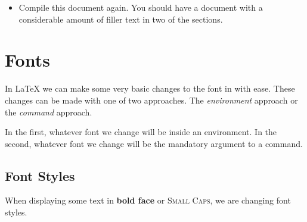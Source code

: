 \begin{itemize}
\begin{itemize}
    \begin{lstlisting}
\section{Short Content}


     \end{lstlisting}


     As long as the downloaded file was placed in the
     appropriate place, you can safely ignore what this command does.

   \item Similarly, add \texttt{\textbackslash{}input\{./loremipsum.txt\}} on a new
     line directly after \texttt{\textbackslash{}section\{Long~Content\}}, as in

    \begin{lstlisting}
\section{Long Content}


     \end{lstlisting}

     As long as the downloaded file was placed in the appropriate place, you can
     safely ignore what this command does.
   \end{itemize}

 \item Compile this document again. You should have a document with a
   considerable amount of filler text in two of the sections.
\end{itemize}

\section{Fonts}

In \LaTeX{} we can make some very basic changes to the font in with ease. These
changes can be made with one of two approaches. The \textit{environment}
approach or the \textit{command} approach.

In the first, whatever font we change will be inside an environment. In the
second, whatever font we change will be the mandatory argument to a command.

\subsection*{Font Styles}
When displaying some text in \textbf{bold face} or \textsc{Small Caps}, we are
changing font styles.

